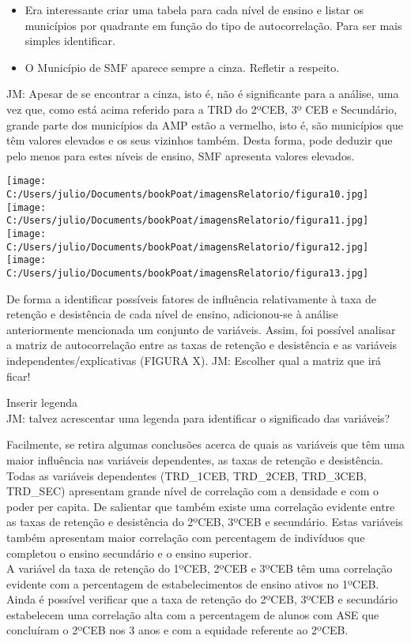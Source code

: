 \documentclass[
]{book}
\begin{document}
\begin{itemize}
\item
  Era interessante criar uma tabela para cada nível de ensino e listar os municípios por quadrante em função do tipo de autocorrelação. Para ser mais simples identificar.
\item
  O Município de SMF aparece sempre a cinza. Refletir a respeito.
\end{itemize}

JM: Apesar de se encontrar a cinza, isto é, não é significante para a análise, uma vez que, como está acima referido para a TRD do 2ºCEB, 3º CEB e Secundário, grande parte dos municípios da AMP estão a vermelho, isto é, são municípios que têm valores elevados e os seus vizinhos também. Desta forma, pode deduzir que pelo menos para estes níveis de ensino, SMF apresenta valores elevados.

\texttt{[image: C:/Users/julio/Documents/bookPoat/imagensRelatorio/figura10.jpg]}\\
\texttt{[image: C:/Users/julio/Documents/bookPoat/imagensRelatorio/figura11.jpg]}\\
\texttt{[image: C:/Users/julio/Documents/bookPoat/imagensRelatorio/figura12.jpg]}\\
\texttt{[image: C:/Users/julio/Documents/bookPoat/imagensRelatorio/figura13.jpg]}

De forma a identificar possíveis fatores de influência relativamente à taxa de retenção e desistência de cada nível de ensino, adicionou-se à análise anteriormente mencionada um conjunto de variáveis. Assim, foi possível analisar a matriz de autocorrelação entre as taxas de retenção e desistência e as variáveis independentes/explicativas (FIGURA X).
JM: Escolher qual a matriz que irá ficar!

Inserir legenda\\
JM: talvez acrescentar uma legenda para identificar o significado das variáveis?

Facilmente, se retira algumas conclusões acerca de quais as variáveis que têm uma maior influência nas variáveis dependentes, as taxas de retenção e desistência. Todas as variáveis dependentes (TRD\_1CEB, TRD\_2CEB, TRD\_3CEB, TRD\_SEC) apresentam grande nível de correlação com a densidade e com o poder per capita. De salientar que também existe uma correlação evidente entre as taxas de retenção e desistência do 2ºCEB, 3ºCEB e secundário. Estas variáveis também apresentam maior correlação com percentagem de indivíduos que completou o ensino secundário e o ensino superior.\\
A variável da taxa de retenção do 1ºCEB, 2ºCEB e 3ºCEB têm uma correlação evidente com a percentagem de estabelecimentos de ensino ativos no 1ºCEB. Ainda é possível verificar que a taxa de retenção do 2ºCEB, 3ºCEB e secundário estabelecem uma correlação alta com a percentagem de alunos com ASE que concluíram o 2ºCEB nos 3 anos e com a equidade referente ao 2ºCEB.
\end{document}
